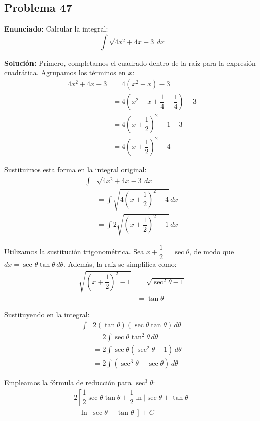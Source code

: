\subsection*{Problema 47}
\textbf{Enunciado:} Calcular la integral:
\begin{equation*}
\int \sqrt{4x^2 + 4x - 3} \, dx
\end{equation*}

\textbf{Solución:}
Primero, completamos el cuadrado dentro de la raíz para la expresión cuadrática.
Agrupamos los términos en $x$:
\begin{align*}
4x^2 + 4x - 3 &= 4(x^2 + x) - 3 \\
&= 4\left(x^2 + x + \dfrac{1}{4} - \dfrac{1}{4}\right) - 3 \\
&= 4\left(x + \dfrac{1}{2}\right)^2 - 1 - 3 \\
&= 4\left(x + \dfrac{1}{2}\right)^2 - 4
\end{align*}

Sustituimos esta forma en la integral original:
\begin{align*}
\int &\sqrt{4x^2 + 4x - 3} \, dx \\
&= \int \sqrt{4\left(x + \dfrac{1}{2}\right)^2 - 4} \, dx \\
&= \int 2\sqrt{\left(x + \dfrac{1}{2}\right)^2 - 1} \, dx
\end{align*}

Utilizamos la sustitución trigonométrica. 
Sea $x + \dfrac{1}{2} = \sec\theta$, de modo que 
$dx = \sec\theta \tan\theta \, d\theta$.
Además, la raíz se simplifica como:
\begin{align*}
\sqrt{\left(x + \dfrac{1}{2}\right)^2 - 1} &= \sqrt{\sec^2\theta - 1} \\
&= \tan\theta
\end{align*}

Sustituyendo en la integral:
\begin{align*}
\int &2(\tan\theta)(\sec\theta \tan\theta) \, d\theta \\
&= 2 \int \sec\theta \tan^2\theta \, d\theta \\
&= 2 \int \sec\theta (\sec^2\theta - 1) \, d\theta \\
&= 2 \int (\sec^3\theta - \sec\theta) \, d\theta
\end{align*}

Empleamos la fórmula de reducción para $\sec^3\theta$:
\begin{align*}
2 \left[ \dfrac{1}{2}\sec\theta\tan\theta + \dfrac{1}{2}\ln|\sec\theta + \tan\theta| \right. \\
\left. - \ln|\sec\theta + \tan\theta| \right] + C
\end{align*}

